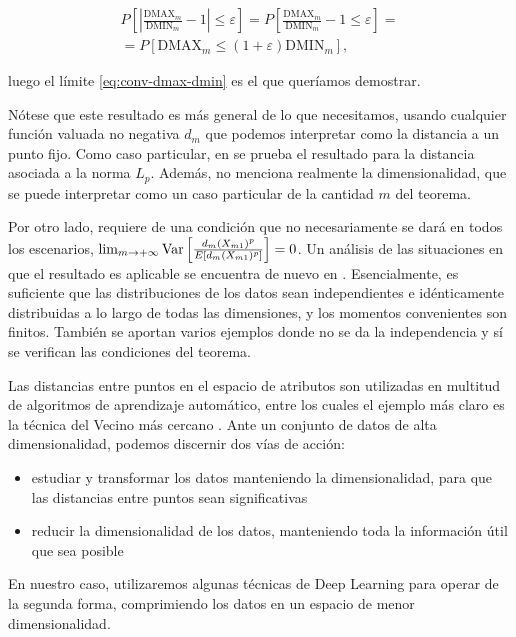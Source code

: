 \begin{gather*}
  P\left[\left\lvert \frac{\mathrm{DMAX}_m}{\mathrm{DMIN}_m} - 1 \right\rvert\leq\varepsilon\right]=
P\left[\frac{\mathrm{DMAX}_m}{\mathrm{DMIN}_m} - 1 \leq\varepsilon\right]=\\=
P\left[\mathrm{DMAX}_m\leq (1+ \varepsilon)\mathrm{DMIN}_m \right],
\end{gather*}

luego el límite \eqref{eq:conv-dmax-dmin} es el que queríamos demostrar.
\proofe
\theoe

Nótese que este resultado es más general de lo que necesitamos, usando
cualquier función valuada no negativa \(d_m\) que podemos interpretar
como la distancia a un punto fijo. Como caso particular, en
\textcite{aggarwal2001} se prueba el resultado para la distancia
asociada a la norma \(L_p\). Además, no menciona realmente la
dimensionalidad, que se puede interpretar como un caso particular de la
cantidad \(m\) del teorema.

Por otro lado, requiere de una condición que no necesariamente se dará
en todos los escenarios,
\(\lim_{m\rightarrow +\infty}\mathrm{Var}\left[\frac{d_m(X_{m1})^p}{E[d_m(X_{m1})^p]}\right]=0\).
Un análisis de las situaciones en que el resultado es aplicable se
encuentra de nuevo en \textcite{beyer1999}. Esencialmente, es suficiente
que las distribuciones de los datos sean independientes e idénticamente
distribuidas a lo largo de todas las dimensiones, y los momentos
convenientes son finitos. También se aportan varios ejemplos donde no se
da la independencia y sí se verifican las condiciones del teorema.

Las distancias entre puntos en el espacio de atributos son utilizadas en
multitud de algoritmos de aprendizaje automático, entre los cuales el
ejemplo más claro es la técnica del Vecino más cercano
\autocite{peterson2009}. Ante un conjunto de datos de alta
dimensionalidad, podemos discernir dos vías de acción:

\begin{itemize}
\tightlist
\item
  estudiar y transformar los datos manteniendo la dimensionalidad, para
  que las distancias entre puntos sean significativas
\item
  reducir la dimensionalidad de los datos, manteniendo toda la
  información útil que sea posible
\end{itemize}

En nuestro caso, utilizaremos algunas técnicas de Deep Learning para
operar de la segunda forma, comprimiendo los datos en un espacio de
menor dimensionalidad.

